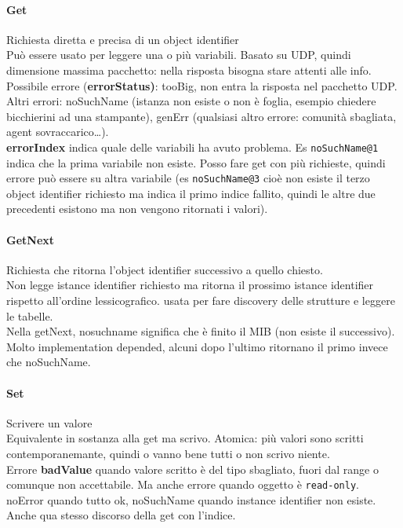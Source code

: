 \documentclass[10pt]{book}
\begin{document}
\paragraph{Get} Richiesta diretta e precisa di un object identifier\\
Può essere usato per leggere una o più variabili. Basato su UDP, quindi dimensione massima pacchetto: nella risposta bisogna stare attenti alle info. Possibile errore (\textbf{errorStatus)}: tooBig, non entra la risposta nel pacchetto UDP. Altri errori: noSuchName (istanza non esiste o non è foglia, esempio chiedere bicchierini ad una stampante), genErr (qualsiasi altro errore: comunità sbagliata, agent sovraccarico\ldots).\\
\textbf{errorIndex} indica quale delle variabili ha avuto problema. Es \texttt{noSuchName@1} indica che la prima variabile non esiste. Posso fare get con più richieste, quindi errore può essere su altra variabile (es \texttt{noSuchName@3} cioè non esiste il terzo object identifier richiesto ma indica il primo indice fallito, quindi le altre due precedenti esistono ma non vengono ritornati i valori).
\paragraph{GetNext} Richiesta che ritorna l'object identifier successivo a quello chiesto.\\
Non legge istance identifier richiesto ma ritorna il prossimo istance identifier rispetto all'ordine lessicografico. usata per fare discovery delle strutture e leggere le tabelle.\\Nella getNext, nosuchname significa che è finito il MIB (non esiste il successivo). Molto implementation depended, alcuni dopo l'ultimo ritornano il primo invece che noSuchName.

\paragraph{Set} Scrivere un valore\\
Equivalente in sostanza alla get ma scrivo. Atomica: più valori sono scritti contemporanemante, quindi o vanno bene tutti o non scrivo niente.\\
Errore \textbf{badValue} quando valore scritto è del tipo sbagliato, fuori dal range o comunque non accettabile. Ma anche errore quando oggetto è \texttt{read-only}.\\
noError quando tutto ok, noSuchName quando instance identifier non esiste. Anche qua stesso discorso della get con l'indice.
\end{document}
